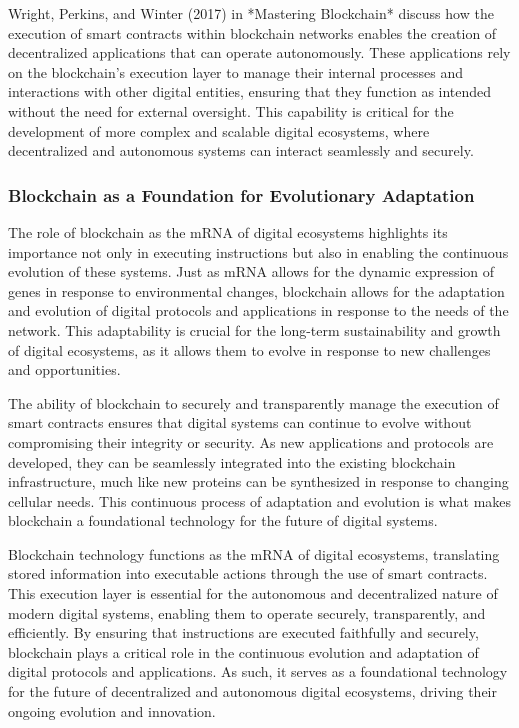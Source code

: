 \documentclass[12pt,twoside]{article}
\begin{document}
Wright, Perkins, and Winter (2017) in *Mastering Blockchain* discuss how the execution of smart contracts within blockchain networks enables the creation of decentralized applications that can operate autonomously. These applications rely on the blockchain’s execution layer to manage their internal processes and interactions with other digital entities, ensuring that they function as intended without the need for external oversight. This capability is critical for the development of more complex and scalable digital ecosystems, where decentralized and autonomous systems can interact seamlessly and securely.

\subsubsection{Blockchain as a Foundation for Evolutionary Adaptation}

The role of blockchain as the mRNA of digital ecosystems highlights its importance not only in executing instructions but also in enabling the continuous evolution of these systems. Just as mRNA allows for the dynamic expression of genes in response to environmental changes, blockchain allows for the adaptation and evolution of digital protocols and applications in response to the needs of the network. This adaptability is crucial for the long-term sustainability and growth of digital ecosystems, as it allows them to evolve in response to new challenges and opportunities.

The ability of blockchain to securely and transparently manage the execution of smart contracts ensures that digital systems can continue to evolve without compromising their integrity or security. As new applications and protocols are developed, they can be seamlessly integrated into the existing blockchain infrastructure, much like new proteins can be synthesized in response to changing cellular needs. This continuous process of adaptation and evolution is what makes blockchain a foundational technology for the future of digital systems.

Blockchain technology functions as the mRNA of digital ecosystems, translating stored information into executable actions through the use of smart contracts. This execution layer is essential for the autonomous and decentralized nature of modern digital systems, enabling them to operate securely, transparently, and efficiently. By ensuring that instructions are executed faithfully and securely, blockchain plays a critical role in the continuous evolution and adaptation of digital protocols and applications. As such, it serves as a foundational technology for the future of decentralized and autonomous digital ecosystems, driving their ongoing evolution and innovation.
\end{document}

